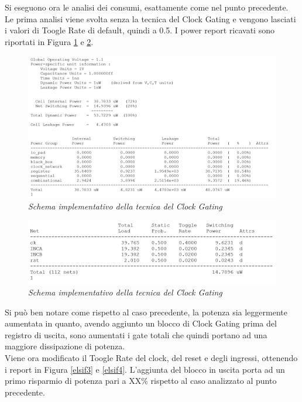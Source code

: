 {Si eseguono ora le analisi dei consumi, esattamente come nel punto precedente.\\
Le prima analisi viene svolta senza la tecnica del Clock Gating e vengono lasciati i valori di Toogle Rate di default, quindi a 0.5. I power report ricavati sono riportati in Figura \ref{elsif1} e \ref{elsif2}.
\begin{figure}[!htb]
	\centering
	\includegraphics[scale=0.65]{immagini/elsif1}
	\caption{\textit{Schema implementativo della tecnica del Clock Gating}}
	\label{elsif1}
\end{figure}
\begin{figure}[!htb]
	\centering
	\includegraphics[scale=0.65]{immagini/elsif2}
	\caption{\textit{Schema implementativo della tecnica del Clock Gating}}
	\label{elsif2}
\end{figure}
Si può ben notare come rispetto al caso precedente, la potenza sia leggermente aumentata in quanto, avendo aggiunto un blocco di Clock Gating prima del registro di uscita, sono aumentati i gate totali che quindi portano ad una maggiore dissipazione di potenza. \\
Viene ora modificato il Toogle Rate del clock, del reset e degli ingressi, ottenendo i report in Figura \ref{elsif3} e \ref{elsif4}. L'aggiunta del blocco in uscita porta ad un primo risparmio di potenza pari a XX\% rispetto al caso analizzato al punto precedente. \\
\begin{figure}[!htb]

\end{figure}}
